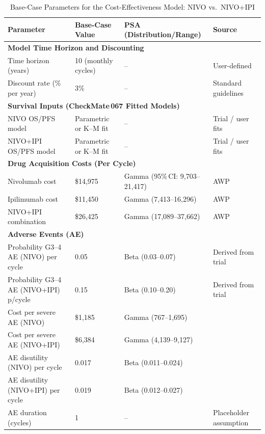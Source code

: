 \documentclass[preprint, 3p,
authoryear]{elsarticle} %
\begin{document}
\begin{table}[ht!]
\centering
\caption{Base-Case Parameters for the Cost-Effectiveness Model: NIVO vs.\ NIVO+IPI}
\label{tab:cea-parameters}
\begin{tabular}{l l l l}
\toprule
\textbf{Parameter} & \textbf{Base-Case Value} & \textbf{PSA (Distribution/Range)} & \textbf{Source} \\
\midrule
\multicolumn{4}{l}{\textbf{Model Time Horizon and Discounting}} \\
\midrule
Time horizon (years)               & 10 (monthly cycles) & -- & User-defined \\ 
Discount rate (\% per year)        & 3\%                 & -- & Standard guidelines \\

\midrule
\multicolumn{4}{l}{\textbf{Survival Inputs (CheckMate\,067 Fitted Models)}} \\
\midrule
NIVO OS/PFS model       & Parametric or K--M fit & -- & Trial / user fits \\
NIVO+IPI OS/PFS model   & Parametric or K--M fit & -- & Trial / user fits \\

\midrule
\multicolumn{4}{l}{\textbf{Drug Acquisition Costs (Per Cycle)}} \\
\midrule
Nivolumab cost          & \$14{,}975 & Gamma (95\%\,CI: 9{,}703--21{,}417) & AWP\cite{ref1} \\ 
Ipilimumab cost         & \$11{,}450 & Gamma (7{,}413--16{,}296)          & AWP\cite{ref2} \\
NIVO+IPI combination    & \$26{,}425 & Gamma (17{,}089--37{,}662)         & AWP\cite{ref1,ref2} \\

\midrule
\multicolumn{4}{l}{\textbf{Adverse Events (AE)}} \\
\midrule
Probability G3--4 AE (NIVO) per cycle   & 0.05 & Beta (0.03--0.07) & Derived from trial \\
Probability G3--4 AE (NIVO+IPI) p/cycle & 0.15 & Beta (0.10--0.20) & Derived from trial \\
Cost per severe AE (NIVO)               & \$1{,}185 & Gamma (767--1{,}695)  & \cite{ref3,ref4}\\
Cost per severe AE (NIVO+IPI)           & \$6{,}384 & Gamma (4{,}139--9{,}127) & \cite{ref3,ref4}\\
AE disutility (NIVO) per cycle          & 0.017 & Beta (0.011--0.024)     & \cite{ref5,ref6}\\
AE disutility (NIVO+IPI) per cycle      & 0.019 & Beta (0.012--0.027)     & \cite{ref5,ref6}\\
AE duration (cycles)                    & 1     & --                      & Placeholder assumption \\


\end{tabular}
\end{table}
\end{document}
